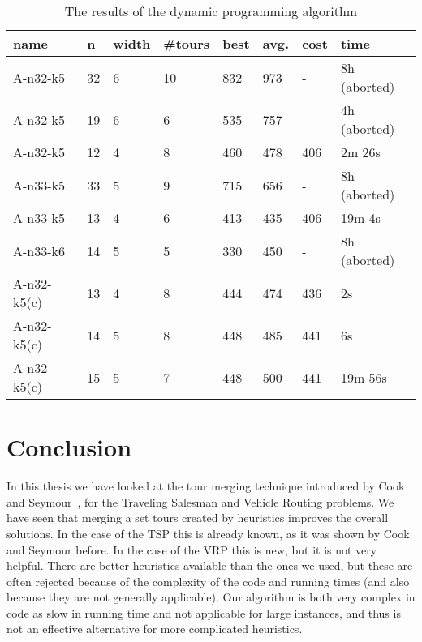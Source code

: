 \documentclass[titlepage, 12pt]{article}
\begin{document}
    \begin{table}
    \begin{tabular}{l l l l l l l l}
        name        & n     & width & \#tours   & best  & avg. & cost   & time \\ \hline
        A-n32-k5    & 32    & 6     & 10        & 832   & 973  & -      & 8h (aborted) \\
        A-n32-k5    & 19    & 6     & 6         & 535   & 757  & -      & 4h (aborted) \\
        A-n32-k5    & 12    & 4     & 8         & 460   & 478  & 406    & 2m 26s \\
        A-n33-k5    & 33    & 5     & 9         & 715   & 656  & -      & 8h (aborted) \\
        A-n33-k5    & 13    & 4     & 6         & 413   & 435  & 406    & 19m 4s \\
        A-n33-k6    & 14    & 5     & 5         & 330   & 450  & -      & 8h (aborted) \\
        A-n32-k5(c) & 13    & 4     & 8         & 444   & 474  & 436    & 2s \\
        A-n32-k5(c) & 14    & 5     & 8         & 448   & 485  & 441    & 6s \\
        A-n32-k5(c) & 15    & 5     & 7         & 448   & 500  & 441    & 19m 56s \\
    \end{tabular}
    \caption{The results of the dynamic programming algorithm}
    \label{table:vrp-dp}
    \end{table}



%
%
\section{Conclusion}
\label{sec:conclusion}
In this thesis we have looked at the tour merging technique introduced by Cook and
Seymour~\cite{cook-seymour}, for the Traveling Salesman and Vehicle Routing problems.
We have seen that merging a set tours created by heuristics improves the overall solutions. In the
case of the TSP this is already known, as it was shown by Cook and Seymour before. In the case of the
VRP this is new, but it is not very helpful. There are better heuristics available than the ones we
used, but these are often rejected because of the complexity of the code and running times (and also
because they are not generally applicable). Our algorithm is both very complex in code as slow in
running time and not applicable for large instances, and thus is not an effective alternative for
more complicated heuristics.
\end{document}
